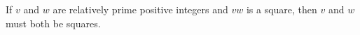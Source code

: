 If $v$ and $w$ are relatively prime positive integers and $vw$ is a square, then $v$ and $w$ must both be squares.
